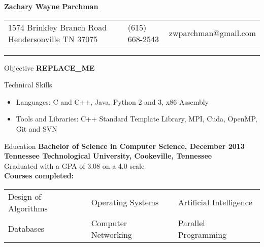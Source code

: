 \documentclass[10pt]{res}
\newcommand{\replaceme}{\huge{\bf{REPLACE\_ME}}}
\begin{document}
 
\nocite{*}

%

\fontsize{10}{11}\selectfont

\begin{center}
\begin{Huge}
    \bf{Zachary Wayne Parchman}
\end{Huge}
\end{center}

\begin{resume}

\begin{large}
\begin{tabularx}{\textwidth}{p{2.25in} X X}
    1574 Brinkley Branch Road \newline Hendersonville TN 37075
    & (615) 668-2543 & zwparchman@gmail.com\\
\end{tabularx}
\end{large}

\vspace{-0.30in}
\rule{\textwidth}{0.4pt}
\vspace{-0.30in}

\begin{section}{Objective}
    \replaceme
\end{section}

\begin{section}{Technical Skills}
\begin{itemize}[leftmargin=*] \itemsep -2pt  %
    \item {Languages: C and C++, Java, Python 2 and 3, x86 Assembly}
    \item {Tools and Libraries: C++ Standard Template Library, MPI, Cuda, OpenMP, Git and SVN}
\end{itemize}
\end{section}

\begin{section}{Education}
    {\bf Bachelor of Science in Computer Science, December 2013\\
    Tennessee Technological University, Cookeville, Tennessee}\\
    Graduated with a GPA of 3.08 on a 4.0 scale\\
    {\bf Courses completed:}

    \vspace{-0.15in}
    \begin{tabularx}{\textwidth}{l l l}
        Design of Algorithms & Operating Systems & Artificial Intelligence \\
        Databases & Computer Networking & Parallel Programming \\
    \end{tabularx}


\end{section}
\end{resume}
\end{document}
